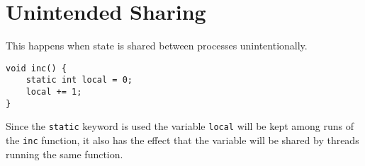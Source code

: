 \section{Unintended Sharing}

This happens when state is shared between processes unintentionally.

\begin{lstlisting}[caption={Example of unintended sharing.}]
void inc() {
    static int local = 0;
    local += 1;
}
\end{lstlisting}

Since the \texttt{static} keyword is used the variable \texttt{local} will be kept among runs of the \texttt{inc} function,
it also has the effect that the variable will be shared by threads running the same function.